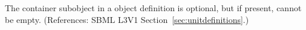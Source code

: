 The \ListOfUnits container subobject in a \UnitDefinition object definition
is optional, but if present, cannot be empty.  (References: SBML L3V1
Section~\ref{sec:unitdefinitions}.)
